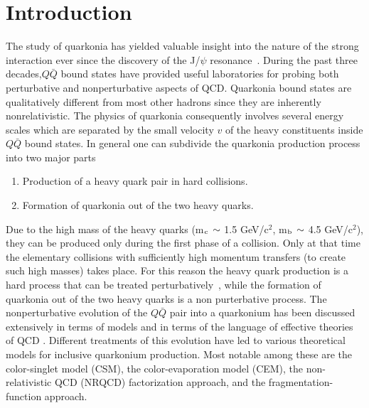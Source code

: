 \documentclass[aps,prc,preprint,superscriptaddress,showpacs,showkeys,amsmath]{revtex4-1}
\begin{document}

\maketitle


\section{Introduction}
The study of quarkonia has yielded valuable insight into the nature of the strong 
interaction ever since the discovery of the J/$\psi$ resonance~\cite{Augustin:1974xw,Aubert:1974js}. 
During the past three decades,$Q\bar Q$ bound states have provided useful laboratories 
for probing both perturbative and nonperturbative aspects of QCD. Quarkonia bound states are qualitatively 
different from most other hadrons since they are inherently nonrelativistic. 
The physics of quarkonia consequently involves several energy scales which are separated by the small velocity $v$ of the heavy 
constituents inside $Q\bar Q$ bound states.
In general one can subdivide the quarkonia production process into two major parts
\begin{enumerate}
\item Production of a heavy quark pair in hard collisions.
\item Formation of quarkonia out of the two heavy quarks.
\end{enumerate}
Due to the high mass of the heavy quarks (m$_{\rm c}\,\sim$ 1.5 GeV/c$^2$, m$_{\rm b}\,\sim$ 4.5 GeV/c$^2$), 
they can be produced only during the first phase of a collision.
Only at that time the elementary collisions with sufficiently high momentum 
transfers (to create such high masses) takes place. For this reason the heavy quark production
is a hard process that can be treated perturbatively~\cite{Nason:1987xz,Nason:1989zy}, while the formation
of quarkonia out of the two heavy quarks is a non purterbative process.
The nonperturbative evolution of the $Q\bar Q$ pair into a quarkonium
has been discussed extensively in terms of models and in terms of the
language of effective theories of QCD
\cite{Bodwin:1994jh,Brambilla:2004wf}. Different
treatments of this evolution have led to various theoretical models for
inclusive quarkonium production. Most notable among these are the color-singlet
model (CSM), the color-evaporation model (CEM), the non-relativistic QCD
(NRQCD) factorization approach, and the fragmentation-function approach.
\end{document}

